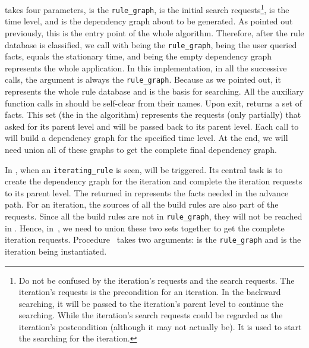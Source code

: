 \documentclass{article}
\begin{document}
 takes four parameters,  is the
\texttt{rule\_graph},  is the initial search 
requests\footnote{Do not be confused by the iteration's requests and
  the search requests. The iteration's requests is the precondition
  for an iteration. In the backward searching, it will be passed to
  the iteration's parent level to continue the searching. While the
  iteration's search requests could be regarded as the iteration's
  postcondition (although it may not actually be). It is used to start
  the searching for the iteration.},
 is the time level, and  is the dependency graph
about to be generated. As pointed out previously, this is the entry
point of the whole algorithm. Therefore, after the rule database is
classified, we call  with  being the
\texttt{rule\_graph},  being the user queried facts,
 equals the stationary time, and  being the empty
dependency graph represents the whole application. In this
implementation, in all the successive  calls, the
 argument is always the \texttt{rule\_graph}. Because as we
pointed out, it represents the whole rule database and is the basis
for searching. All the auxiliary
function calls in  should be self-clear from their
names. Upon exit,  returns a set of facts. This set
(the  in the algorithm) represents the requests (only
partially) that  asked for its parent level and will be
passed back to its parent level. Each call to  will
build a dependency graph for the specified time level. At the end, we
will need union all of these graphs to get the complete
final dependency graph. 

In , when an \texttt{iterating\_rule} is seen,
 will be triggered. Its central task is to
create the dependency graph for the iteration and complete the
iteration requests to its parent level. The  returned in
 represents the facts needed in the advance
path. For an iteration, the sources of all the build rules are also
part of the requests. Since all the build rules are not in
\texttt{rule\_graph}, they will not be reached in
. Hence, in~, we need to
union these two sets together to get the complete iteration
requests. Procedure~ takes two arguments:
 is the \texttt{rule\_graph} and  is the iteration being
instantiated. 
\end{document}
